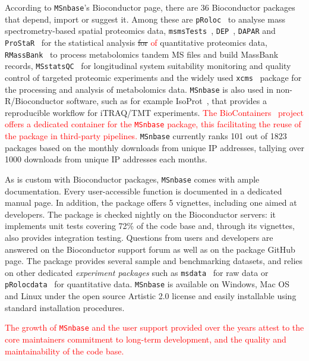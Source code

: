 \documentclass[journal=jacsat,manuscript=article]{achemso}\usepackage[]{graphicx}\usepackage[]{color}
\begin{document}
According to \texttt{MSnbase}'s Bioconductor page, there are 36
Bioconductor packages that depend, import or suggest it. Among these
are \texttt{pRoloc}~\cite{Gatto:2014a} to analyse mass
spectrometry-based spatial proteomics data,
\texttt{msmsTests}~\cite{msmsTests}, \texttt{DEP}~\cite{Zhang:2018},
\texttt{DAPAR} and \texttt{ProStaR}~\cite{Wieczorek:2017} for the
statistical analysis \sout{for} \textcolor{red}{of} quantitative
proteomics data, \texttt{RMassBank}~\cite{Stravs:2013} to process
metabolomics tandem MS files and build MassBank records,
\texttt{MSstatsQC}~\cite{Dogu:2017} for longitudinal system
suitability monitoring and quality control of targeted proteomic
experiments and the widely used \texttt{xcms}~\cite{Smith:2006}
package for the processing and analysis of metabolomics
data. \texttt{MSnbase} is also used in non-R/Bioconductor software,
such as for example IsoProt~\cite{Griss:2019}, that provides a
reproducible workflow for iTRAQ/TMT experiments. \textcolor{red}{The
  BioContainers~\cite{da_Veiga_Leprevost:2017} project offers a
  dedicated container for the \texttt{MSnbase} package, this
  facilitating the reuse of the package in third-party pipelines.}
\texttt{MSnbase} currently ranks 101 out of 1823 packages based on the
monthly downloads from unique IP addresses, tallying over 1000
downloads from unique IP addresses each months.

As is custom with Bioconductor packages, \texttt{MSnbase} comes with
ample documentation. Every user-accessible function is documented in a
dedicated manual page. In addition, the package offers 5 vignettes,
including one aimed at developers. The package is checked nightly on
the Bioconductor servers: it implements unit tests covering 72\% of
the code base and, through its vignettes, also provides integration
testing. Questions from users and developers are answered on the
Bioconductor support forum as well as on the package GitHub page. The
package provides several sample and benchmarking datasets, and relies
on other dedicated \textit{experiment packages} such as
\texttt{msdata}~\cite{msdata} for raw data or
\texttt{pRolocdata}~\cite{Gatto:2014a} for quantitative
data. \texttt{MSnbase} is available on Windows, Mac OS and Linux under
the open source Artistic 2.0 license and easily installable using
standard installation procedures.


\textcolor{red}{The growth of \texttt{MSnbase} and the user support
  provided over the years attest to the core maintainers commitment to
  long-term development, and the quality and maintainability of the
  code base.}
\end{document}
